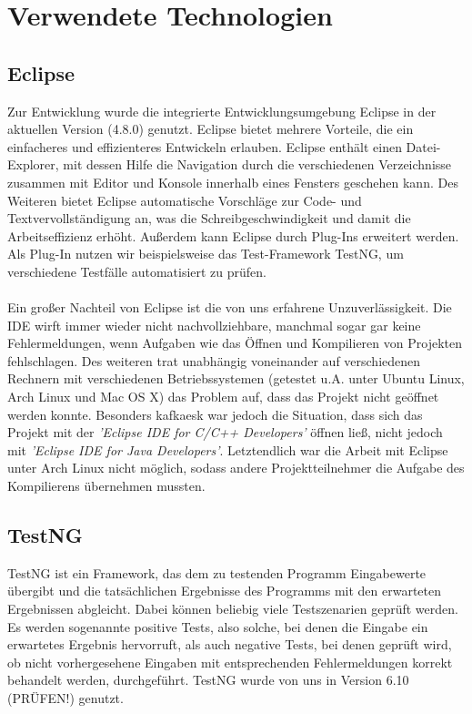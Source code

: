 
\section{Verwendete Technologien}

\subsection{Eclipse}
Zur Entwicklung wurde die integrierte Entwicklungsumgebung Eclipse in der aktuellen Version (4.8.0) genutzt. 
Eclipse bietet mehrere Vorteile, die ein einfacheres und effizienteres Entwickeln erlauben. Eclipse enthält einen Datei-Explorer, mit dessen Hilfe die Navigation durch die verschiedenen Verzeichnisse zusammen mit Editor und Konsole innerhalb eines Fensters geschehen kann. Des Weiteren bietet Eclipse automatische Vorschläge zur Code- und Textvervollständigung an, was die Schreibgeschwindigkeit und damit die Arbeitseffizienz erhöht. 
Außerdem kann Eclipse durch Plug-Ins erweitert werden. Als Plug-In nutzen wir beispielsweise das Test-Framework TestNG, um verschiedene Testfälle automatisiert zu prüfen.
\\\\
Ein großer Nachteil von Eclipse ist die von uns erfahrene Unzuverlässigkeit. Die IDE wirft immer wieder nicht nachvollziehbare, manchmal sogar gar keine Fehlermeldungen, wenn Aufgaben wie das Öffnen und Kompilieren von Projekten fehlschlagen. Des weiteren trat unabhängig voneinander auf verschiedenen Rechnern mit verschiedenen Betriebssystemen (getestet u.A. unter Ubuntu Linux, Arch Linux und Mac OS X) das Problem auf, dass das Projekt nicht geöffnet werden konnte. Besonders kafkaesk war jedoch die Situation, dass sich das Projekt mit der \textit{'Eclipse IDE for C/C++ Developers'} öffnen ließ, nicht jedoch mit \textit{'Eclipse IDE for Java Developers'}. Letztendlich war die Arbeit mit Eclipse unter Arch Linux nicht möglich, sodass andere Projektteilnehmer die Aufgabe des Kompilierens übernehmen mussten.

\subsection{TestNG}
TestNG ist ein Framework, das dem zu testenden Programm Eingabewerte übergibt und die tatsächlichen Ergebnisse des Programms mit den erwarteten Ergebnissen abgleicht. Dabei können beliebig viele Testszenarien geprüft werden. Es werden sogenannte positive Tests, also solche, bei denen die Eingabe ein erwartetes Ergebnis hervorruft, als auch negative Tests, bei denen geprüft wird, ob nicht vorhergesehene Eingaben mit entsprechenden Fehlermeldungen korrekt behandelt werden, durchgeführt. TestNG wurde von uns in Version 6.10 (PRÜFEN!) genutzt.

